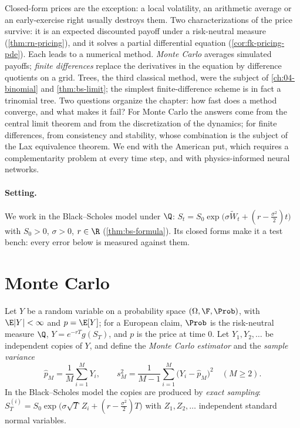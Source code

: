 
Closed-form prices are the exception: a local volatility, an arithmetic average or an
early-exercise right usually destroys them. Two characterizations of the price survive: it is
an expected discounted payoff under a risk-neutral measure (\cref{thm:rn-pricing}), and it solves
a partial differential equation (\cref{cor:fk-pricing-pde}). Each leads to a numerical method.
\emph{Monte Carlo} averages simulated payoffs; \emph{finite differences} replace the derivatives in
the equation by difference quotients on a grid. Trees, the third classical method, were the subject
of \cref{ch:04-binomial} and \cref{thm:bs-limit}; the simplest finite-difference scheme is in fact a
trinomial tree. Two questions organize the chapter: how fast does a method converge, and what makes
it fail? For Monte Carlo the answers come from the central limit theorem and from the
discretization of the dynamics; for finite differences, from consistency and stability, whose
combination is the subject of the Lax equivalence theorem. We end with the American put, which
requires a complementarity problem at every time step, and with physics-informed neural networks.

\paragraph{Setting.} We work in the Black--Scholes model under $\Q$:
$S_t=S_0\exp\big(\sigma\widetilde W_t+(r-\frac{\sigma^2}2)t\big)$ with $S_0>0$, $\sigma>0$, $r\in\R$
(\cref{thm:bs-formula}). Its closed forms make it a test bench: every error below is measured
against them.

\section{Monte Carlo}\label{sec:num-mc}

Let $Y$ be a random variable on a probability space $(\Omega,\F,\Prob)$, with $\E|Y|<\infty$ and
$p=\E[Y]$; for a European claim, $\Prob$ is the risk-neutral measure $\Q$, $Y=e^{-rT}g(S_T)$, and $p$ is
the price at time $0$. Let $Y_1,Y_2,\dots$ be independent
copies of $Y$, and define the \emph{Monte Carlo estimator} and the \emph{sample variance}
\[
  \hat p_M=\frac1M\sum_{i=1}^MY_i,\qquad
  s_M^2=\frac1{M-1}\sum_{i=1}^M\big(Y_i-\hat p_M\big)^2\quad(M\ge2).
\]
In the Black--Scholes model the copies are produced by \emph{exact sampling}:
$S_T^{(i)}=S_0\exp\big(\sigma\sqrt T\,Z_i+(r-\frac{\sigma^2}{2})T\big)$ with $Z_1,Z_2,\dots$
independent standard normal variables.

